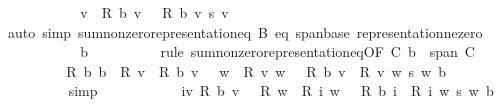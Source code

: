\begin{isabellebody}
\ \ \ \ \ \ \isamarkupfalse%
\ \isamarkupfalse%
\ {\isacartoucheopen}{\isasymdots}\ {\isacharequal}{\kern0pt}\ {\isacharparenleft}{\kern0pt}{\isasymSum}v\ {\isacharbar}{\kern0pt}\ {\isacharquery}{\kern0pt}R{\isacharprime}{\kern0pt}\ b\ v\ {\isasymnoteq}\ {}{\isachardot}{\kern0pt}\ {\isacharquery}{\kern0pt}R{\isacharprime}{\kern0pt}\ b\ v\ {\isacharasterisk}{\kern0pt}s\ v{\isacharparenright}{\kern0pt}{\isacartoucheclose}\isanewline
\ \ \ \ \ \ \ \ \isamarkupfalse%
\ {\isacharparenleft}{\kern0pt}auto\ simp{\isacharcolon}{\kern0pt}\ sum{\isacharunderscore}{\kern0pt}nonzero{\isacharunderscore}{\kern0pt}representation{\isacharunderscore}{\kern0pt}eq\ B\ eq\ span{\isacharunderscore}{\kern0pt}base\ representation{\isacharunderscore}{\kern0pt}ne{\isacharunderscore}{\kern0pt}zero{\isacharparenright}{\kern0pt}\isanewline
\ \ \ \ \ \ \isamarkupfalse%
\ \isamarkupfalse%
\ {\isacartoucheopen}{\isasymdots}\ {\isacharequal}{\kern0pt}\ b{\isacartoucheclose}\isanewline
\ \ \ \ \ \ \ \ \isamarkupfalse%
\ {\isacharparenleft}{\kern0pt}rule\ sum{\isacharunderscore}{\kern0pt}nonzero{\isacharunderscore}{\kern0pt}representation{\isacharunderscore}{\kern0pt}eq{\isacharbrackleft}{\kern0pt}OF\ C\ {\isacartoucheopen}b\ {\isasymin}\ span\ C{\isacartoucheclose}{\isacharbrackright}{\kern0pt}{\isacharparenright}{\kern0pt}\isanewline
\ \ \ \ \ \ \isamarkupfalse%
\ \isamarkupfalse%
\ {\isachardoublequoteopen}{\isacharquery}{\kern0pt}R\ b\ b\ {\isacharequal}{\kern0pt}\ {\isacharquery}{\kern0pt}R\ {\isacharparenleft}{\kern0pt}{\isasymSum}v\ {\isacharbar}{\kern0pt}\ {\isacharquery}{\kern0pt}R{\isacharprime}{\kern0pt}\ b\ v\ {\isasymnoteq}\ {}{\isachardot}{\kern0pt}\ {\isasymSum}w\ {\isacharbar}{\kern0pt}\ {\isacharquery}{\kern0pt}R\ v\ w\ {\isasymnoteq}\ {}{\isachardot}{\kern0pt}\ {\isacharparenleft}{\kern0pt}{\isacharquery}{\kern0pt}R{\isacharprime}{\kern0pt}\ b\ v\ {\isacharasterisk}{\kern0pt}\ {\isacharquery}{\kern0pt}R\ v\ w{\isacharparenright}{\kern0pt}\ {\isacharasterisk}{\kern0pt}s\ w{\isacharparenright}{\kern0pt}\ b{\isachardoublequoteclose}\isanewline
\ \ \ \ \ \ \ \ \isamarkupfalse%
\ simp\isanewline
\ \ \ \ \ \ \isamarkupfalse%
\ \isamarkupfalse%
\ {\isachardoublequoteopen}{\isachardot}{\kern0pt}{\isachardot}{\kern0pt}{\isachardot}{\kern0pt}\ {\isacharequal}{\kern0pt}\ {\isacharparenleft}{\kern0pt}{\isasymSum}i{\isasymin}{\isacharbraceleft}{\kern0pt}v{\isachardot}{\kern0pt}\ {\isacharquery}{\kern0pt}R{\isacharprime}{\kern0pt}\ b\ v\ {\isasymnoteq}\ {}{\isacharbraceright}{\kern0pt}{\isachardot}{\kern0pt}\ {\isacharquery}{\kern0pt}R\ {\isacharparenleft}{\kern0pt}{\isasymSum}w\ {\isacharbar}{\kern0pt}\ {\isacharquery}{\kern0pt}R\ i\ w\ {\isasymnoteq}\ {}{\isachardot}{\kern0pt}\ {\isacharparenleft}{\kern0pt}{\isacharquery}{\kern0pt}R{\isacharprime}{\kern0pt}\ b\ i\ {\isacharasterisk}{\kern0pt}\ {\isacharquery}{\kern0pt}R\ i\ w{\isacharparenright}{\kern0pt}\ {\isacharasterisk}{\kern0pt}s\ w{\isacharparenright}{\kern0pt}\ b{\isacharparenright}{\kern0pt}{\isachardoublequoteclose}\isanewline

\end{isabellebody}
